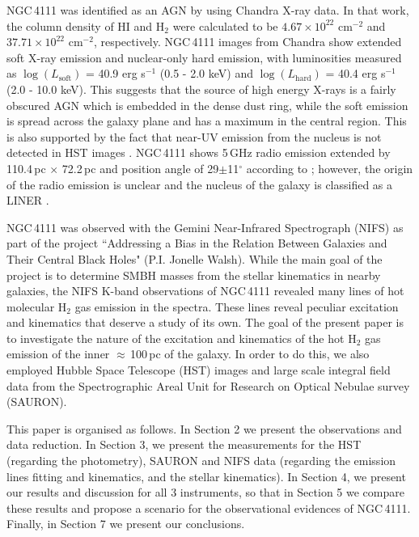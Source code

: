 \documentclass[fleqn,usenatbib]{mnras}
\begin{document}
NGC\,4111 was identified as an AGN by \citet{gonzalez-martin_x-ray_2009} using Chandra X-ray data. In that work, the column density of HI and H$_2$ were calculated to be $4.67 \times 10^{22}$ cm$^{-2}$ and $37.71 \times 10^{22}$ cm$^{-2}$, respectively. NGC\,4111 images from Chandra show extended soft X-ray emission and nuclear-only hard emission, with luminosities measured as $\log(L_\mathrm{soft})$ = 40.9 erg s$^{-1}$ (0.5 - 2.0 keV) and $\log(L_\mathrm{hard})$ = 40.4 erg s$^{-1}$ (2.0 - 10.0 keV). This suggests that the source of high energy X-rays is a fairly obscured AGN which is embedded in the dense dust ring, while the soft emission is spread across the galaxy plane and has a maximum in the central region. This is also supported by the fact that near-UV emission from the nucleus is not detected in HST images \citep{barth_search_1998}. NGC\,4111 shows 5\,GHz radio emission extended by 110.4\,pc$\,\times$\,72.2\,pc and position angle of 29$\pm$11$^\circ$ according to \citet{nyland_atlas3d_2016}; however, the origin of the radio emission is unclear and the nucleus of the galaxy is classified as a LINER \citep{ho_search_1997}.
 
 NGC\,4111 was observed with the Gemini Near-Infrared Spectrograph (NIFS) as part of the project ``Addressing a Bias in the Relation Between Galaxies and Their Central Black Holes" (P.I. Jonelle Walsh). While the main goal of the project is to determine SMBH masses from the stellar kinematics in nearby galaxies, the NIFS K-band observations of NGC\,4111 revealed many lines of hot molecular H$_2$ gas emission in the spectra. These lines reveal peculiar excitation and kinematics that deserve a study of its own. The goal of the present paper is to investigate the nature of the excitation and kinematics of the hot H$_2$ gas emission of the inner $\approx$\,100\,pc of the galaxy. In order to do this, we also employed Hubble Space Telescope (HST) images and large scale integral field data from the Spectrographic Areal Unit for Research on Optical Nebulae survey (SAURON).
 
 This paper is organised as follows. In Section 2 we present the observations and data reduction. In Section 3, we present the measurements for the HST (regarding the photometry), SAURON and NIFS data (regarding the emission lines fitting and kinematics, and the stellar kinematics). In Section 4, we present our results and discussion for all 3 instruments, so that in Section 5 we compare these results and propose a scenario for the observational evidences of NGC\,4111. Finally, in Section 7 we present our conclusions.
 
\end{document}
